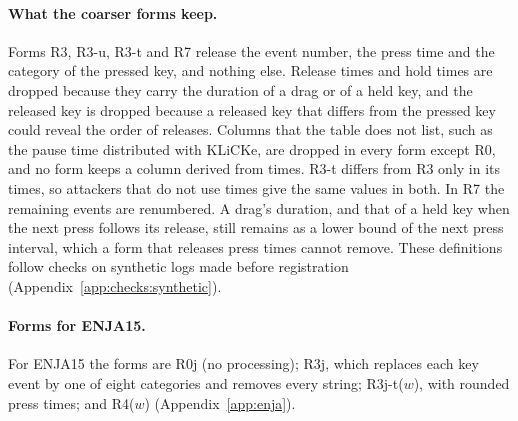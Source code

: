 \paragraph{What the coarser forms keep.}
Forms R3, R3-u, R3-t and R7 release the event number, the press time and the category of the pressed key, and nothing
else. Release times and hold times are dropped because they carry the duration of a drag or of a held key, and the
released key is dropped because a released key that differs from the pressed key could reveal the order of releases.
Columns that the table does not list, such as the pause time distributed with KLiCKe, are dropped in every form except
R0, and no form keeps a column derived from times. R3-t differs from R3 only in its times, so attackers that do not
use times give the same values in both. In R7 the remaining events are renumbered. A drag's duration, and that of a
held key when the next press follows its release, still remains as a lower bound of the next press interval, which a
form that releases press times cannot remove. These definitions follow checks on synthetic logs made before
registration (Appendix~\ref{app:checks:synthetic}).

\paragraph{Forms for ENJA15.}
For ENJA15 the forms are R0j (no processing); R3j, which replaces each key event by one of eight categories and
removes every string; R3j-t($w$), with rounded press times; and R4($w$) (Appendix~\ref{app:enja}).
